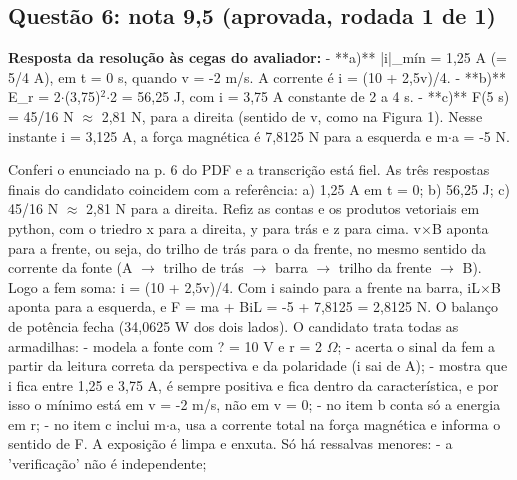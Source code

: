 \documentclass{article}%
\begin{document}
\subsection*{Questão 6: nota 9,5 (aprovada, rodada 1 de 1)}%
\textbf{Resposta da resolução às cegas do avaliador:} {-} **a)** |i|\_mín = 1,25 A (= 5/4 A), em t = 0 s, quando v = -2 m/s. A corrente é i = (10 + 2,5v)/4.\newline%
{-} **b)** E\_r = 2$\cdot$(3,75)$^2$$\cdot$2 = 56,25 J, com i = 3,75 A constante de 2 a 4 s.\newline%
{-} **c)** F(5 s) = 45/16 N $\approx$ 2,81 N, para a direita (sentido de v, como na Figura 1). Nesse instante i = 3,125 A, a força magnética é 7,8125 N para a esquerda e m$\cdot$a = -5 N.\par %
Conferi o enunciado na p. 6 do PDF e a transcrição está fiel. As três respostas finais do candidato coincidem com a referência: a) 1,25 A em t = 0; b) 56,25 J; c) 45/16 N $\approx$ 2,81 N para a direita. Refiz as contas e os produtos vetoriais em python, com o triedro x para a direita, y para trás e z para cima. v$\times$B aponta para a frente, ou seja, do trilho de trás para o da frente, no mesmo sentido da corrente da fonte (A $\to$ trilho de trás $\to$ barra $\to$ trilho da frente $\to$ B). Logo a fem soma: i = (10 + 2,5v)/4. Com i saindo para a frente na barra, iL$\times$B aponta para a esquerda, e F = ma + BiL = -5 + 7,8125 = 2,8125 N. O balanço de potência fecha (34,0625 W dos dois lados).\newline%
\newline%
O candidato trata todas as armadilhas:\newline%
{-} modela a fonte com ? = 10 V e r = 2 $\Omega$;\newline%
{-} acerta o sinal da fem a partir da leitura correta da perspectiva e da polaridade (i sai de A);\newline%
{-} mostra que i fica entre 1,25 e 3,75 A, é sempre positiva e fica dentro da característica, e por isso o mínimo está em v = -2 m/s, não em v = 0;\newline%
{-} no item b conta só a energia em r;\newline%
{-} no item c inclui m$\cdot$a, usa a corrente total na força magnética e informa o sentido de F.\newline%
\newline%
A exposição é limpa e enxuta. Só há ressalvas menores:\newline%
{-} a 'verificação' não é independente;\newline%
$$
\end{document}
